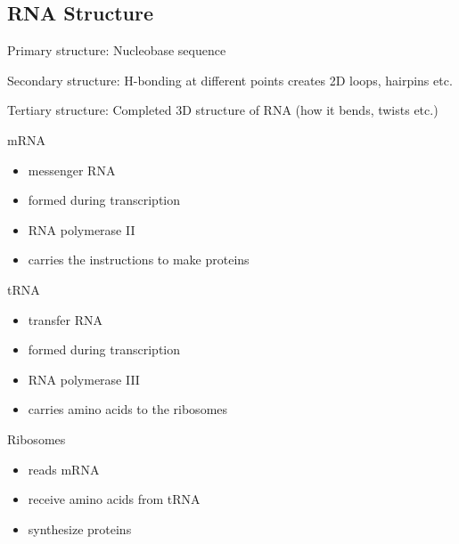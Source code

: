 \documentclass[11pt,fleqn]{book}
\begin{document}
\subsection{RNA Structure}
\begin{descriptions}
    \item[Primary structure:] Nucleobase sequence 
    \item[Secondary structure:] H-bonding at different points creates 2D loops, hairpins etc.
    \item[Tertiary structure:] Completed 3D structure of RNA (how it bends, twists etc.)
    \item[mRNA] 
    \begin{itemize}
        \item messenger RNA
        \item formed during transcription
        \item RNA polymerase II
        \item carries the instructions to make proteins
    \end{itemize}
    \item[tRNA]
    \begin{itemize}
        \item transfer RNA
        \item formed during transcription
        \item RNA polymerase III
        \item carries amino acids to the ribosomes
    \end{itemize}
    \item[Ribosomes]
    \begin{itemize}
        \item reads mRNA
        \item receive amino acids from tRNA
        \item synthesize proteins
    \end{itemize}
\end{descriptions} 
\end{document}
